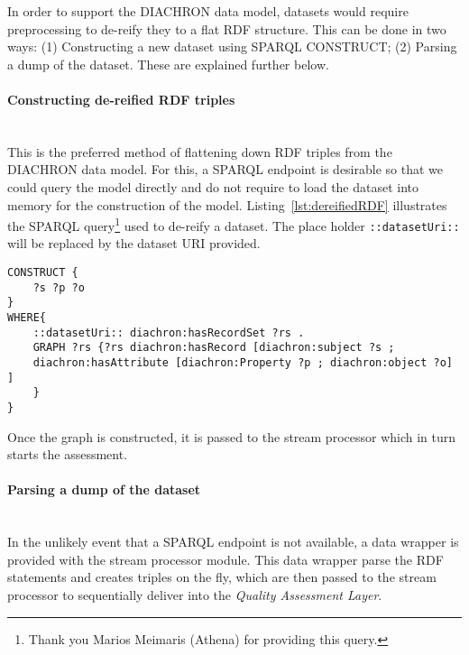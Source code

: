 In order to support the DIACHRON data model, datasets would require preprocessing to de-reify they to a flat RDF structure.
This can be done in two ways: (1) Constructing a new dataset using SPARQL CONSTRUCT; (2) Parsing a dump of the dataset.
These are explained further below.

\paragraph{Constructing de-reified RDF triples}~\\
This is the preferred method of flattening down RDF triples from the DIACHRON data model.
For this, a SPARQL endpoint is desirable so that we could query the model directly and do not require to load the dataset into memory for the construction of the model.
Listing~\ref{lst:dereifiedRDF} illustrates the SPARQL query\footnote{Thank you Marios Meimaris (Athena) for providing this query.} used to de-reify a dataset.
The place holder \texttt{::datasetUri::} will be replaced by the dataset URI provided.
\begin{lstlisting}[language=N3,label=lst:dereifiedRDF]
CONSTRUCT {
	?s ?p ?o
}
WHERE{
	::datasetUri:: diachron:hasRecordSet ?rs .
	GRAPH ?rs {?rs diachron:hasRecord [diachron:subject ?s ;
	diachron:hasAttribute [diachron:Property ?p ; diachron:object ?o] ]
	}
}
\end{lstlisting}
Once the graph is constructed, it is passed to the stream processor which in turn starts the assessment.

\paragraph{Parsing a dump of the dataset}~\\
In the unlikely event that a SPARQL endpoint is not available, a data wrapper is provided with the stream processor module.
This data wrapper parse the RDF statements and creates triples on the fly, which are then passed to the stream processor to sequentially deliver into the \emph{Quality Assessment Layer}.

